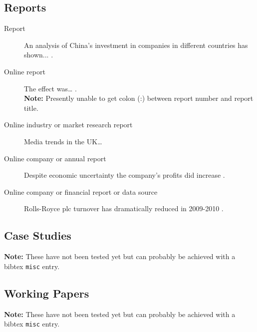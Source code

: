 \subsection{Reports}
\label{sec:Reports}
\begin{description}
\item[Report] An analysis of China’s investment in companies in different countries has shown... \cite{wolf_chinas_2011}.
\item[Online report] The effect was… \cite{curry_-flight_1989}.\\
\textbf{Note:} Presently unable to get colon (:) between report number and report title.
\item[Online industry or market research report] Media trends in the UK…\cite{marketline_media_2013}
\item[Online company or annual report] Despite economic uncertainty the
company’s profits did increase \cite{rolls-royce_group_plc_annual_2011}.
\item[Online company or financial report or data source] Rolls-Royce plc turnover has dramatically
reduced in 2009-2010 \cite{bureau_van_dijk_rolls-royce_2010}.
\end{description}


\subsection{Case Studies}
\textbf{Note:} These have not been tested yet but can probably be achieved with a bibtex \verb#misc# entry.

\subsection{Working Papers}
\textbf{Note:} These have not been tested yet but can probably be achieved with a bibtex \verb#misc# entry.




